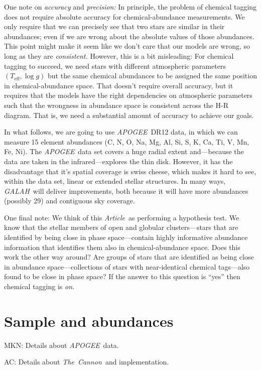 \documentclass[12pt, letterpaper, preprint]{aastex}
\newcommand{\acronym}[1]{{\small{#1}}}
\newcommand{\project}[1]{\textsl{#1}}
\newcommand{\apogee}{\project{\acronym{APOGEE}}}
\newcommand{\galah}{\project{\acronym{GALAH}}}
\newcommand{\thecannon}{\project{The~Cannon}}
\newcommand{\documentname}{\textsl{Article}}
\newcommand{\teff}{T_{\mathrm{eff}}}
\newcommand{\logg}{\log g}
\begin{document}
One note on \emph{accuracy} and \emph{precision:}
In principle, the problem of chemical tagging does not require
absolute accuracy for chemical-abundance measurements.
We only require that we can precisely see that two stars are similar
in their abundances; even if we are wrong about the absolute values of
those abundances.
This point might make it seem like we don't care that our models are
wrong, so long as they are \emph{consistent.}
However, this is a bit misleading:
For chemical tagging to succeed, we need stars with different
atmospheric parameters $(\teff, \logg)$ but the same chemical
abundances to be assigned the same position in chemical-abundance
space.
That doesn't require overall accuracy, but it requires that the models
have the right dependencies on atmospheric parameters such that the
wrongness in abundance space is consistent across the H-R diagram.
That is, we need a substantial amount of accuracy to achieve our goals.

In what follows, we are going to use \apogee\ \acronym{DR12} data, in
which we can measure 15 element abundances (C, N, O, Na, Mg, Al, Si,
S, K, Ca, Ti, V, Mn, Fe, Ni).
The \apogee\ data set covers a huge radial extent and---because the
data are taken in the infrared---explores the thin disk.
However, it has the disadvantage that it's spatial coverage is swiss
cheese, which makes it hard to see, within the data set, linear or
extended stellar structures.
In many ways, \galah\ will deliver improvements, both because it will
have more abundances (possibly 29) and contiguous sky coverage.

One final note:
We think of this \documentname\ as performing a hypothesis test.
We know that the stellar members of open and globular clusters---stars
that are identified by being close in phase space---contain highly
informative abundance information that identifies them also in
chemical-abundance space.
Does this work the other way around?
Are groups of stars that are identified as being close in abundance
space---collections of stars with near-identical chemical tags---also
found to be close in phase space?
If the answer to this question is ``yes'' then chemical tagging is
\emph{on.}

\section{Sample and abundances}

MKN: Details about \apogee\ data.

AC: Details about \thecannon\ and implementation.
\end{document}
